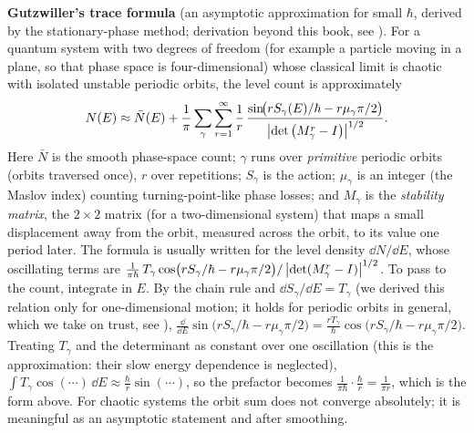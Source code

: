 \begin{beyond}
\textbf{Gutzwiller's trace formula} (an asymptotic approximation for small $\hbar$, derived by the stationary-phase method; derivation beyond this book, see \cite{gutzwiller}). For a quantum system with two degrees of freedom (for example a particle moving in a plane, so that phase space is four-dimensional) whose classical limit is chaotic with isolated unstable periodic orbits, the level count is approximately
\begin{equation}
N(E)\approx\bar N(E)+\frac1\pi\sum_{\gamma}\sum_{r=1}^\infty\frac{1}{r}\,\frac{\sin\!\bigl(rS_\gamma(E)/\hbar-r\mu_\gamma\pi/2\bigr)}{\left\lvert \det\left(M_\gamma^r-I\right)\right\rvert^{1/2}} .
\label{eq:hilbert-polya-gutz}
\end{equation}
Here $\bar N$ is the smooth phase-space count; $\gamma$ runs over \emph{primitive} periodic orbits (orbits traversed once), $r$ over repetitions; $S_\gamma$ is the action; $\mu_\gamma$ is an integer (the Maslov index) counting turning-point-like phase losses; and $M_\gamma$ is the \emph{stability matrix}, the $2\times2$ matrix (for a two-dimensional system) that maps a small displacement away from the orbit, measured across the orbit, to its value one period later. The formula is usually written for the level density $\dd N/\dd E$, whose oscillating terms are $\frac{1}{\pi\hbar}\,T_\gamma\cos\bigl(rS_\gamma/\hbar-r\mu_\gamma\pi/2\bigr)/\left\lvert \det(M_\gamma^r-I)\right\rvert^{1/2}$. To pass to the count, integrate in $E$. By the chain rule and $\dd S_\gamma/\dd E=T_\gamma$ (we derived this relation only for one-dimensional motion; it holds for periodic orbits in general, which we take on trust, see \cite{gutzwiller}), $\frac{\dd}{\dd E}\sin\bigl(rS_\gamma/\hbar-r\mu_\gamma\pi/2\bigr)=\frac{rT_\gamma}{\hbar}\cos\bigl(rS_\gamma/\hbar-r\mu_\gamma\pi/2\bigr)$. Treating $T_\gamma$ and the determinant as constant over one oscillation (this is the approximation: their slow energy dependence is neglected), $\int T_\gamma\cos(\cdots)\,\dd E\approx\frac{\hbar}{r}\sin(\cdots)$, so the prefactor becomes $\frac{1}{\pi\hbar}\cdot\frac{\hbar}{r}=\frac{1}{\pi r}$, which is the form above. For chaotic systems the orbit sum does not converge absolutely; it is meaningful as an asymptotic statement and after smoothing.
\end{beyond}

